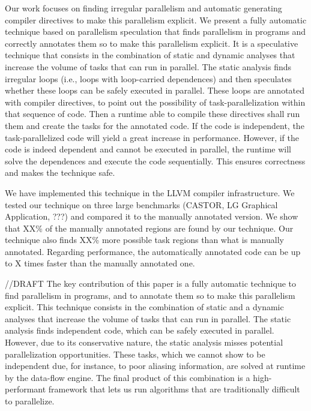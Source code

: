 \documentclass[pageno]{jpaper}
\begin{document}
Our work focuses on finding irregular parallelism and automatic generating compiler directives to make this parallelism explicit.
We present a fully automatic technique based on parallelism speculation that finds parallelism in programs and correctly annotates them so to make this parallelism explicit.
It is a speculative technique that consists in the combination of static and dynamic analyses that increase the volume of tasks that can run in parallel.
The static analysis finds irregular loops (i.e., loops with loop-carried dependences) and then speculates whether these loops can be safely executed in parallel. These loops
are annotated with compiler directives, to point out the possibility of task-parallelization within that sequence of code. Then a runtime able to compile these directives shall run them
and create the tasks for the annotated code. If the code is independent, the task-parallelized code will yield a great increase in performance. 
However, if the code is indeed dependent and cannot be executed in parallel, the runtime will solve the dependences and execute the code sequentially. 
This ensures correctness and makes the technique safe.

We have implemented this technique in the LLVM compiler infrastructure. We tested our technique on three large benchmarks (CASTOR, LG Graphical Application, ???) and compared it to the manually annotated version. We show that XX\% of the manually annotated regions are found by our technique. Our technique also finds XX\% more possible task regions than what is manually annotated. Regarding performance, the automatically annotated code can be up to X times faster than the manually annotated one.


//DRAFT
The key contribution of this paper is a fully automatic technique to find parallelism in programs, and to annotate them so to make this parallelism explicit.
This technique consists in the combination of static and a dynamic analyses that increase the volume of tasks that can run in parallel.
The static analysis finds independent code, which can be safely executed in parallel.
However, due to its conservative nature, the static analysis misses potential parallelization opportunities.
These tasks, which we cannot show to be independent due, for instance, to poor aliasing information, are solved at runtime by the data-flow engine.
The final product of this combination is a high-performant framework that
lets us run algorithms that are traditionally difficult to parallelize.
\end{document}
